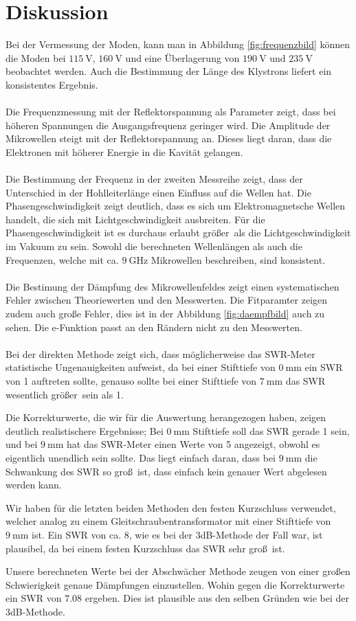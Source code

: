 \section{Diskussion}
\label{sec:Diskussion}
Bei der Vermessung der Moden, kann man in Abbildung \ref{fig:frequenzbild}
können die Moden bei $\SI{115}{\volt}$, $\SI{160}{\volt}$ und eine
Überlagerung von $\SI{190}{\volt}$ und $\SI{235}{\volt}$ beobachtet werden.
Auch die Bestimmung der Länge des Klystrons liefert ein konsistentes Ergebnis.
\\~\\
Die Frequenzmessung mit der Reflektorspannung als Parameter zeigt,
dass bei höheren Spannungen die Ausgangsfrequenz geringer wird.
Die Amplitude der Mikrowellen steigt mit der Reflektorspannung an.
Dieses liegt daran, dass die Elektronen mit höherer Energie in die Kavität gelangen.
\\~\\
Die Bestimmung der Frequenz in der zweiten Messreihe zeigt,
dass der Unterschied in der Hohlleiterlänge einen Einfluss auf die Wellen hat.
Die Phasengeschwindigkeit zeigt deutlich, dass es sich um Elektromagnetsche Wellen handelt,
die sich mit Lichtgeschwindigkeit ausbreiten.
Für die Phasengeschwindigkeit ist es durchaus erlaubt größer\, als die
Lichtgeschwindigkeit im Vakuum zu sein.
Sowohl die berechneten Wellenlängen als auch die Frequenzen, welche mit ca.
$\SI{9}{\giga\hertz}$ Mikrowellen beschreiben, sind konsistent.
\\~\\
Die Bestimung der Dämpfung des Mikrowellenfeldes zeigt einen systematischen Fehler zwischen
Theoriewerten und den Messwerten.
Die Fitparamter zeigen zudem auch große Fehler, dies ist in der Abbildung \ref{fig:daempfbild}
auch zu sehen.
Die e-Funktion passt an den Rändern nicht zu den Messwerten.
\\~\\
Bei der direkten Methode zeigt sich, dass möglicherweise das SWR-Meter statistische
Ungenauigkeiten aufweist, da bei einer Stifttiefe von $\SI{0}{\milli\metre}$ ein SWR von 1
auftreten sollte, genauso sollte bei einer Stifttiefe von $\SI{7}{\milli\metre}$ das SWR
wesentlich größer \,sein als 1.

Die Korrekturwerte, die wir für die Auswertung herangezogen haben, zeigen
deutlich realistischere Ergebnisse; Bei $\SI{0}{\milli\metre}$ Stifttiefe soll
das SWR gerade 1 sein, und bei $\SI{9}{\milli\metre}$ hat das SWR-Meter einen
Werte von 5 angezeigt, obwohl es eigentlich unendlich sein sollte.
Das liegt einfach daran, dass bei $\SI{9}{\milli\metre}$ die Schwankung des
SWR so groß\, ist, dass einfach kein genauer Wert abgelesen werden kann.

Wir haben für die letzten beiden Methoden den festen Kurzschluss verwendet, welcher analog zu einem Gleitschraubentransformator mit einer Stifttiefe von $\SI{9}{\milli\metre}$ ist.
Ein SWR von ca. 8, wie es bei der 3dB-Methode der Fall war, ist
plausibel, da bei einem festen Kurzschluss das SWR sehr groß\, ist.

Unsere berechneten Werte bei der Abschwächer Methode zeugen von einer großen\,
Schwierigkeit genaue Dämpfungen einzustellen. Wohin gegen die Korrekturwerte
ein SWR von $\num{7.08}$ ergeben. Dies ist plausible aus den selben Gründen
wie bei der 3dB-Methode.
